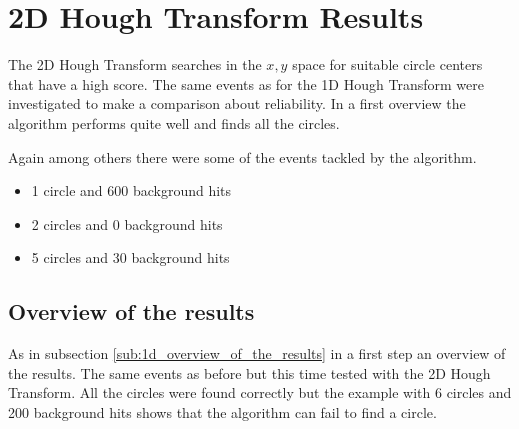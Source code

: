 \documentclass[11pt,twoside]{scrreprt}
\begin{document}

\clearpage
\section{2D Hough Transform Results} %
\label{sec:2d_hough_transform_results}
The 2D Hough Transform searches in the $x,y$ space for suitable
circle centers that have a high score. The same events as for the 1D
Hough Transform were investigated to make a comparison about reliability.
In a first overview the algorithm performs quite well and finds all the
circles.

Again among others there were some of the events tackled by the algorithm.
\begin{itemize}
  \item 1 circle and 600 background hits
  \item 2 circles and 0 background hits
  \item 5 circles and 30 background hits
\end{itemize} 

\subsection{Overview of the results} %
\label{sub:2d_overview_of_the_results}
As in subsection \ref{sub:1d_overview_of_the_results} in a first step an overview of the results. The same events as before but this time tested with the 2D
Hough Transform. All the circles were found correctly but the example with 6 circles and 200 background hits shows that the algorithm can fail to find a 
circle.
\end{document}
